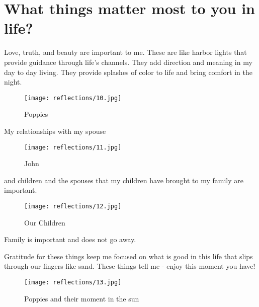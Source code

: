 \section{What things matter most to you in life?}
Love, truth, and beauty are important to me.
These are like harbor lights that provide guidance through life's channels.
They add direction and meaning in my day to day living.
They provide splashes of color to life and bring comfort in the night.

\begin{figure}
\centering
\texttt{[image: reflections/10.jpg]}
\caption{
Poppies
}
\end{figure}

My relationships with my spouse 

\begin{figure}
\centering
\texttt{[image: reflections/11.jpg]}
\caption{
John
}
\end{figure}
and children and the spouses that my children have brought to my family are important.

\begin{figure}
\centering
\texttt{[image: reflections/12.jpg]}
\caption{
Our Children
}
\end{figure}

Family is important and does not go away.

Gratitude for these things keep me focused on what is good in this life that slips through our fingers like sand.
These things tell me - enjoy this moment you have!

\begin{figure}
\centering
\texttt{[image: reflections/13.jpg]}
\caption{
Poppies and their moment in the sun
}
\end{figure}





